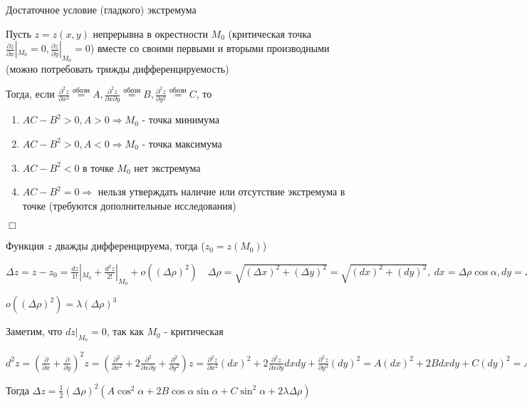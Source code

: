 \documentclass[12pt]{article}
\begin{document}
    \Th Достаточное условие (гладкого) экстремума

    Пусть $z = z(x, y)$ непрерывна в окрестности $M_0$ (критическая точка $\frac{\partial z}{\partial x} |_{M_0} = 0, \frac{\partial z}{\partial y} |_{M_0} = 0$)
    вместе со своими первыми и вторыми производными (можно потребовать трижды дифференцируемость)

    Тогда, если $\frac{\partial^2 z}{\partial x^2} \stackrel{\text{обозн}}{=} A, \frac{\partial^2 z}{\partial x \partial y} \stackrel{\text{обозн}}{=} B, \frac{\partial^2 z}{\partial y^2} \stackrel{\text{обозн}}{=} C$, то

    \begin{enumerate}
        \item $AC - B^2 > 0, A > 0 \Longrightarrow M_0$ - точка минимума
        \item $AC - B^2 > 0, A < 0 \Longrightarrow M_0$ - точка максимума
        \item $AC - B^2 < 0$ в точке $M_0$ нет экстремума
        \item $AC - B^2 = 0\Longrightarrow$ нельзя утверждать наличие или отсутствие экстремума в точке (требуются дополнительные исследования)
    \end{enumerate}

    $\Box$

    Функция $z$ дважды дифференцируема, тогда ($z_0 = z(M_0)$)

    $\Delta z = z - z_0 = \frac{dz}{1!} |_{M_0} + \frac{d^2 z}{2!} |_{M_0} + o((\Delta \rho)^2) \quad \Delta \rho = \sqrt{(\Delta x)^2 + (\Delta y)^2} = \sqrt{(dx)^2 + (dy)^2}, \ dx = \Delta\rho \cos\alpha, dy = \Delta\rho \sin\alpha$

    $o((\Delta \rho)^2) = \lambda (\Delta \rho)^3$

    Заметим, что $dz |_{M_0} = 0$, так как $M_0$ - критическая

    $d^2 z = \left(\frac{\partial}{\partial x} + \frac{\partial}{\partial y}\right)^2 z = \left(\frac{\partial^2}{\partial x^2} + 2 \frac{\partial^2}{\partial x \partial y} + \frac{\partial^2}{\partial y^2}\right) z =
    \frac{\partial^2 z}{\partial x^2} (dx)^2 + 2 \frac{\partial^2 z}{\partial x \partial y} dxdy + \frac{\partial^2 z}{\partial y^2} (dy)^2 = A (dx)^2 + 2B dxdy + C(dy)^2 =
    A(\Delta \rho)^2 \cos^2\alpha + 2B (\Delta \rho)^2 \cos\alpha\sin\alpha + C(\Delta \rho)^2 \sin^2\alpha$

    Тогда $\Delta z = \frac{1}{2} (\Delta \rho)^2 (A\cos^2\alpha + 2B\cos\alpha\sin\alpha + C\sin^2\alpha + 2\lambda \Delta \rho)$
\end{document}
